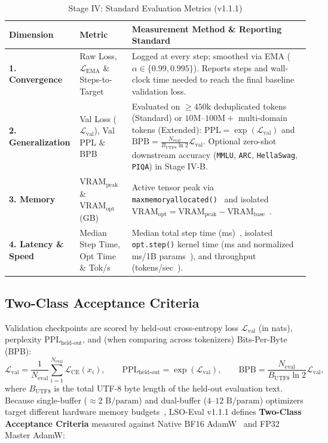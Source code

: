 \documentclass[11pt,a4paper]{article}
\renewcommand{\_}{\origunderscore\allowbreak}
\begin{document}
\begin{table}[htbp]
\centering
\caption{Stage IV: Standard Evaluation Metrics (v1.1.1)}
\label{tab:stage4_metrics}
\vspace{0.3em}
\small
\begin{tabularx}{\textwidth}{@{}l l Y@{}}
\toprule
\textbf{Dimension} & \textbf{Metric} & \textbf{Measurement Method \& Reporting Standard} \\
\midrule
\textbf{1. Convergence} & Raw Loss, $\mathcal{L}_{\text{EMA}}$ \& Steps-to-Target & Logged at every step; smoothed via EMA ($\alpha \in \{0.99, 0.995\}$). Reports steps and wall-clock time needed to reach the final baseline validation loss. \\[0.35em]
\textbf{2. Generalization} & Val Loss ($\mathcal{L}_{\text{val}}$), Val PPL \& BPB & Evaluated on $\ge 450\text{k}$ deduplicated tokens (Standard) or $10\text{M}$--$100\text{M}+$ multi-domain tokens (Extended): $\text{PPL} = \exp(\mathcal{L}_{\text{val}})$ and $\text{BPB} = \frac{N_{\text{eval}}}{B_{\text{UTF8}}\ln 2}\mathcal{L}_{\text{val}}$. Optional zero-shot downstream accuracy (\texttt{MMLU}, \texttt{ARC}, \texttt{HellaSwag}, \texttt{PIQA}) in Stage IV-B. \\[0.35em]
\textbf{3. Memory} & $\text{VRAM}_{\text{peak}}$ \& $\text{VRAM}_{\text{opt}}$ (GB) & Active tensor peak via \texttt{max\_memory\_allocated()}~\cite{paszke2019pytorch} and isolated $\text{VRAM}_{\text{opt}} = \text{VRAM}_{\text{peak}} - \text{VRAM}_{\text{base}}$~\cite{zhao2024galore,dettmers2022eightbit}. \\[0.35em]
\textbf{4. Latency \& Speed} & Median Step Time, Opt Time \& Tok/s & Median total step time (ms)~\cite{brock2021nfnet}, isolated \texttt{opt.step()} kernel time (ms and normalized ms/1B params~\cite{dettmers2022eightbit}), and throughput (tokens/sec~\cite{zhao2024galore}). \\
\bottomrule
\end{tabularx}
\end{table}

\subsection{Two-Class Acceptance Criteria}
\noindent
Validation checkpoints are scored by held-out cross-entropy loss $\mathcal{L}_{\text{val}}$ (in nats), perplexity $\text{PPL}_{\text{held-out}}$, and (when comparing across tokenizers) Bits-Per-Byte (BPB):
\begin{equation}
    \mathcal{L}_{\text{val}} = \frac{1}{N_{\text{eval}}}\sum_{i=1}^{N_{\text{eval}}}\mathcal{L}_{\text{CE}}(x_i), \qquad \text{PPL}_{\text{held-out}} = \exp(\mathcal{L}_{\text{val}}), \qquad \text{BPB} = \frac{N_{\text{eval}}}{B_{\text{UTF8}}\ln 2}\mathcal{L}_{\text{val}},
\end{equation}
where $B_{\text{UTF8}}$ is the total UTF-8 byte length of the held-out evaluation text. Because single-buffer ($\approx 2\text{ B/param}$) and dual-buffer ($4$--$12\text{ B/param}$) optimizers target different hardware memory budgets~\cite{zhao2024galore,dettmers2022eightbit}, LSO-Eval v1.1.1 defines \textbf{Two-Class Acceptance Criteria} measured against Native BF16 AdamW~\cite{loshchilov2019adamw} and FP32 Master AdamW:
\end{document}
